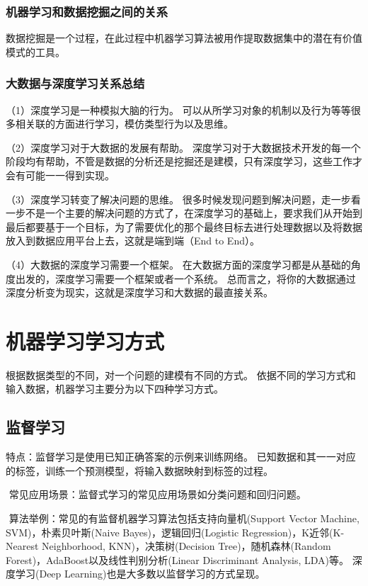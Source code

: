 \subsubsection{\textbf{机器学习和数据挖掘}之间的关系}
数据挖掘是一个过程，在此过程中机器学习算法被用作提取数据集中的潜在有价值模式的工具。
\subsubsection{大数据与深度学习关系总结}
（1）深度学习是一种模拟大脑的行为。
可以从所学习对象的机制以及行为等等很多相关联的方面进行学习，模仿类型行为以及思维。

（2）深度学习对于大数据的发展有帮助。
深度学习对于大数据技术开发的每一个阶段均有帮助，不管是数据的分析还是挖掘还是建模，只有深度学习，这些工作才会有可能一一得到实现。

（3）深度学习转变了解决问题的思维。
很多时候发现问题到解决问题，走一步看一步不是一个主要的解决问题的方式了，在深度学习的基础上，要求我们从开始到最后都要基于一个目标，为了需要优化的那个最终目标去进行处理数据以及将数据放入到数据应用平台上去，这就是端到端（End to End）。

（4）大数据的深度学习需要一个框架。
在大数据方面的深度学习都是从基础的角度出发的，深度学习需要一个框架或者一个系统。
总而言之，将你的大数据通过深度分析变为现实，这就是深度学习和大数据的最直接关系。

\section{机器学习学习方式}
\label{ux673aux5668ux5b66ux4e60ux5b66ux4e60ux65b9ux5f0f}
根据数据类型的不同，对一个问题的建模有不同的方式。
依据不同的学习方式和输入数据，机器学习主要分为以下四种学习方式。
\subsection{ 监督学习}
\label{ux76d1ux7763ux5b66ux4e60}
 特点：监督学习是使用已知正确答案的示例来训练网络。
已知数据和其一一对应的标签，训练一个预测模型，将输入数据映射到标签的过程。

​ 常见应用场景：监督式学习的常见应用场景如分类问题和回归问题。

​ 算法举例：常见的有监督机器学习算法包括支持向量机(Support Vector Machine, SVM)，朴素贝叶斯(Naive Bayes)，逻辑回归(Logistic Regression)，K近邻(K-Nearest Neighborhood, KNN)，决策树(Decision Tree)，随机森林(Random Forest)，AdaBoost以及线性判别分析(Linear Discriminant Analysis, LDA)等。
深度学习(Deep Learning)也是大多数以监督学习的方式呈现。
